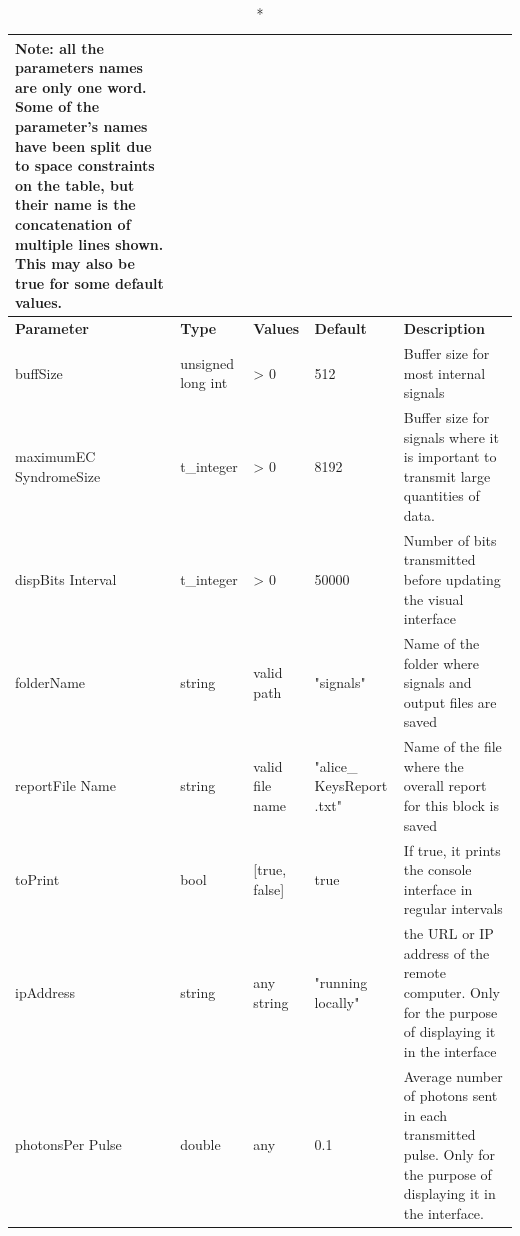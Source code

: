 \begin{longtable}{|p{25mm}|p{20mm}|p{20mm}|p{20mm}|p{45mm}|}
	\caption*{\textbf{Note:} all the parameters names are only one word. Some of the parameter's names have been split due to space constraints on the table, but their name is the concatenation of multiple lines shown. This may also be true for some default values.}\label{table:aliceQkd_in_par}\\	
	\hline
	\textbf{Parameter} & \textbf{Type} & \textbf{Values} &   \textbf{Default} & \textbf{Description}\\ \hline
	buffSize & unsigned long int & > 0 & 512 & Buffer size for most internal
	signals \\\hline
	maximumEC SyndromeSize & t\_integer & > 0 &  8192 & Buffer size for
	signals where it is important to transmit large quantities of data. \\\hline
	dispBits Interval & t\_integer & > 0 & 50000 & Number of bits transmitted
	before updating the visual interface \\\hline
	folderName & string & valid path & "signals" & Name of the folder where
	signals and output files are saved \\\hline
	reportFile Name & string & valid file name & "alice\_ KeysReport .txt" &
	Name of the file where the overall report for this block is saved
	\\\hline
	toPrint & bool & [true, false] & true & If true, it prints the console
	interface in regular intervals \\\hline
	ipAddress & string & any string & "running locally" & the URL or IP
	address of the remote computer. Only for the purpose of displaying it in the
	interface \\\hline
	photonsPer Pulse & double & any & 0.1 & Average number of photons sent in
	each transmitted pulse. Only for the purpose of displaying it in the
	interface. \\\hline
\end{longtable}



